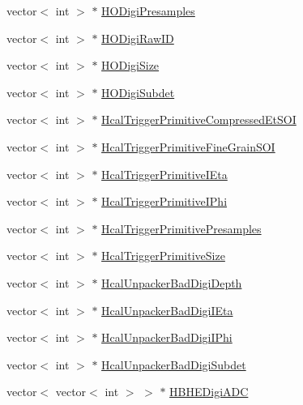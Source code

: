 \begin{DoxyCompactItemize}
\item 
vector$<$ int $>$ $\ast$ \hyperlink{class_hcal_tuple_tree_a419defccb7894e4a204632feef490ccf}{H\+O\+Digi\+Presamples}
\item 
vector$<$ int $>$ $\ast$ \hyperlink{class_hcal_tuple_tree_aa5b1adb6d1e454dbaa1c2ea8c6d1ce17}{H\+O\+Digi\+Raw\+I\+D}
\item 
vector$<$ int $>$ $\ast$ \hyperlink{class_hcal_tuple_tree_a474c798a52945bf3edef9637b3577e75}{H\+O\+Digi\+Size}
\item 
vector$<$ int $>$ $\ast$ \hyperlink{class_hcal_tuple_tree_a19e6167120f3b6e5d9a93340ed80d334}{H\+O\+Digi\+Subdet}
\item 
vector$<$ int $>$ $\ast$ \hyperlink{class_hcal_tuple_tree_aff8eb56b17cec378fb0996f850bacec1}{Hcal\+Trigger\+Primitive\+Compressed\+Et\+S\+O\+I}
\item 
vector$<$ int $>$ $\ast$ \hyperlink{class_hcal_tuple_tree_a39066327f0677ba5edc25eb97d3865aa}{Hcal\+Trigger\+Primitive\+Fine\+Grain\+S\+O\+I}
\item 
vector$<$ int $>$ $\ast$ \hyperlink{class_hcal_tuple_tree_a702f080483a7152f714355afded4f4f0}{Hcal\+Trigger\+Primitive\+I\+Eta}
\item 
vector$<$ int $>$ $\ast$ \hyperlink{class_hcal_tuple_tree_a2a2a59eb3b63204e75540d5d7c08a3a5}{Hcal\+Trigger\+Primitive\+I\+Phi}
\item 
vector$<$ int $>$ $\ast$ \hyperlink{class_hcal_tuple_tree_aeaf7e05adf680e56bb139054b889ae08}{Hcal\+Trigger\+Primitive\+Presamples}
\item 
vector$<$ int $>$ $\ast$ \hyperlink{class_hcal_tuple_tree_a340bb0e90c7f033c6013c9bfbeb1a6ed}{Hcal\+Trigger\+Primitive\+Size}
\item 
vector$<$ int $>$ $\ast$ \hyperlink{class_hcal_tuple_tree_a82028d16026e71637ce6c8a37fe19fa2}{Hcal\+Unpacker\+Bad\+Digi\+Depth}
\item 
vector$<$ int $>$ $\ast$ \hyperlink{class_hcal_tuple_tree_a48eec514f2d009bfb583c129ed741c34}{Hcal\+Unpacker\+Bad\+Digi\+I\+Eta}
\item 
vector$<$ int $>$ $\ast$ \hyperlink{class_hcal_tuple_tree_a554c455a205854a1dca3e67222da4003}{Hcal\+Unpacker\+Bad\+Digi\+I\+Phi}
\item 
vector$<$ int $>$ $\ast$ \hyperlink{class_hcal_tuple_tree_a7ae78222f2c842d8047c8e4d43bf2db5}{Hcal\+Unpacker\+Bad\+Digi\+Subdet}
\item 
vector$<$ vector$<$ int $>$ $>$ $\ast$ \hyperlink{class_hcal_tuple_tree_aabfac31abb8a835c19bc571bdd28632d}{H\+B\+H\+E\+Digi\+A\+D\+C}

\end{DoxyCompactItemize}

